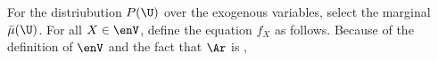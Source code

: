 {%
%
For the distriubution $P(\U)$ over the exogenous variables, 
    select the marginal $\bar\mu(\U)$. 
%
For all $X \in \enV$, define the equation $f_X$ as follows.
Because of the definition of $\enV$ and the fact that $\Ar$ is \subpartl, 
}
